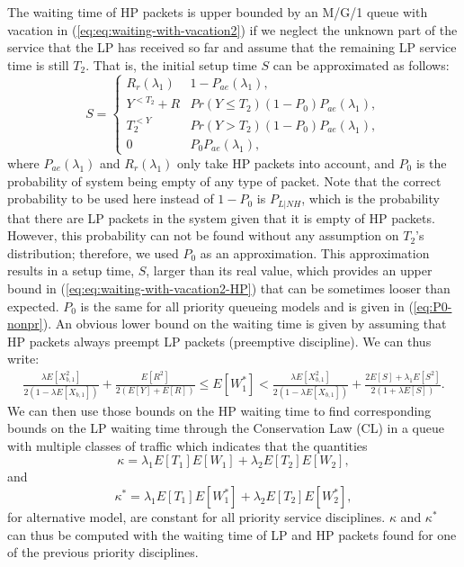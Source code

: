 \documentclass[11pt,journal,oneside,onecolumn,draftclsnofoot]{IEEEtran}
\begin{document}
The waiting time of HP packets is upper bounded by an M/G/1 queue with vacation in (\ref{eq:eq:waiting-with-vacation2}) if we neglect the unknown part of the service that the LP has received so far and assume that the remaining LP service time is still $T_2$. That is, the initial setup time $S$ can be approximated as follows:
\begin{equation}
S=\begin{cases}
R_r(\lambda_1)& 1-P_{ae}(\lambda_1), \\
Y^{<T_2}+R&  Pr(Y \leq T_2)(1-P_0)P_{ae}(\lambda_1),\\
T_2^{<Y}& Pr(Y>T_2)(1-P_0) P_{ae}(\lambda_1),\\
0& P_0 P_{ae}(\lambda_1),
\end{cases}
\label{eq:W1-Estimation-Exp-NewPr-Apx}
\end{equation}
where $P_{ae}(\lambda_1)$ and $R_r(\lambda_1)$ only take HP packets into account, and $P_0$ is the probability of system being empty of any type of packet. Note that the correct probability to be used here instead of $1-P_0$ is $P_{L|NH}$, which is the probability that there are LP packets in the system given that it is empty of HP packets. However, this probability can not be found without any assumption on $T_2$'s distribution; therefore, we used $P_0$ as an approximation. This approximation results in a setup time, $S$, larger than its real value, which provides an upper bound in (\ref{eq:eq:waiting-with-vacation2-HP}) that can be sometimes looser than expected.  
$P_0$ is the same for all priority queueing models and is given in (\ref{eq:P0-nonpr}).
An obvious lower bound on the waiting time is given by assuming that HP packets always preempt LP packets (preemptive discipline). We can thus write:
\begin{equation}
\begin{split}
\frac{\lambda E[X_{b,1}^2]}{2(1-\lambda E[X_{b,1}])}+\frac{E[R^2]}{2(E[Y]+E[R])} \leq  E[W^*_1] < \frac{\lambda E[X_{b,1}^2]}{2(1-\lambda E[X_{b,1}])}+\frac{2E[S]+\lambda_1 E[S^2]}{2(1+\lambda E[S])}.
\end{split}
\label{eq:eq:waiting-with-vacation2-HP}
\end{equation}
We can then use those bounds on the HP waiting time to find corresponding bounds on the LP waiting time through the Conservation Law (CL) in a queue with multiple classes of traffic \cite{kleinrock75} which indicates that the quantities
\begin{equation}
\kappa = \lambda_1 E[T_1] E[W_1] + \lambda_2 E[T_2] E[W_2],
\label{eq:conservation-law}
\end{equation}
and  
\begin{equation}
\kappa^* = \lambda_1 E[T_1] E[W^*_1] + \lambda_2 E[T_2] E[W^*_2],
\label{eq:conservation-law}
\end{equation}
for alternative model, are constant for all priority service disciplines. $\kappa$ and $\kappa^*$ can thus be computed with the waiting time of LP and HP packets found for one of the previous priority disciplines.  
\end{document}
